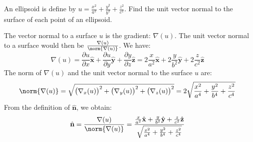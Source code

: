 \documentclass[crop=false,class=book,oneside]{standalone}
\begin{document}
            \begin{problem}
                An ellipsoid is define by
                $u%
                 =\frac{x^{2}}{a^{2}}%
                 +\frac{y^{2}}{b^{2}}%
                 +\frac{z^{2}}{c^{2}}$.
                Find the unit vector normal to the
                surface of each point of an
                ellipsoid.
            \end{problem}
            \begin{solution}
                The vector normal to a surface $u$
                is the gradient: $\nabla(u)$.
                The unit vector normal to a surface would then be
                $\frac{\nabla(u)}{\norm{\nabla(u)}}$. We have:
                \begin{equation}
                    \nabla(u)
                    =\frac{\partial u}{\partial x}\hat{\mathbf{x}}
                    +\frac{\partial u}{\partial y}\hat{\mathbf{y}}
                    +\frac{\partial y}{\partial z}\hat{\mathbf{z}}
                    =2\frac{x}{a^2}\hat{\mathbf{x}}
                    +2\frac{y}{b^2}\hat{\mathbf{y}}
                    +2\frac{z}{c^2}\hat{\mathbf{z}}
                \end{equation}
                The norm of $\nabla(u)$ and the
                unit vector normal to the surface $u$ are:
                \begin{equation}
                    \norm{\nabla(u)}
                    =\sqrt{\big(\nabla_{x}(u)\big)^{2}
                    +\big(\nabla_{y}(u)\big)^{2}
                    +\big(\nabla_{z}(u)\big)^{2}}
                    =2\sqrt{\frac{x^{2}}{a^{4}}
                    +\frac{y^{2}}{b^{4}}
                    +\frac{z^{2}}{c^{4}}}
                \end{equation}
                From the definition of $\hat{\mathbf{n}}$,
                we obtain:
                \begin{equation}
                    \hat{\mathbf{n}}
                    =\frac{\nabla(u)}{\norm{\nabla(u)}}\\
                    =\frac{\frac{x}{a^{2}}\hat{\mathbf{x}}
                           +\frac{y}{b^{2}}\hat{\mathbf{y}}
                           +\frac{z}{c^{2}}\hat{\mathbf{z}}}
                          {\sqrt{\frac{x^{2}}{a^{4}}
                                 +\frac{y^{2}}{b^{4}}
                                 +\frac{z^{2}}{c^{4}}}}
                \end{equation}
            \end{solution}
            \clearpage
\end{document}
